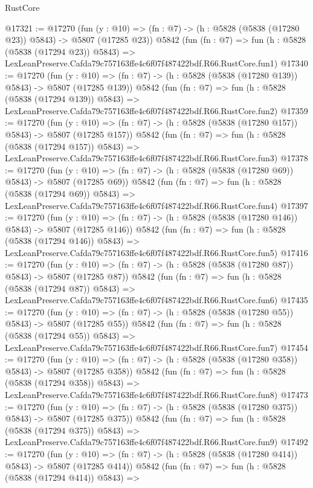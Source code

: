 \begin{lexlean}{RustCore}
\begin{coremodule}
@17321 := @17270
    (fun (y : @10) => (fn : @7) -> (h : @5828 (@5838 (@17280 @23)) @5843) -> @5807 (@17285 @23))
    @5842
    (fun (fn : @7) =>
    fun (h : @5828 (@5838 (@17294 @23)) @5843) =>
    LexLeanPreserve.Cafda79c757163ffe4c6f07f487422bdf.R66.RustCore.fun1)
@17340 := @17270
    (fun (y : @10) => (fn : @7) -> (h : @5828 (@5838 (@17280 @139)) @5843) -> @5807 (@17285 @139))
    @5842
    (fun (fn : @7) =>
    fun (h : @5828 (@5838 (@17294 @139)) @5843) =>
    LexLeanPreserve.Cafda79c757163ffe4c6f07f487422bdf.R66.RustCore.fun2)
@17359 := @17270
    (fun (y : @10) => (fn : @7) -> (h : @5828 (@5838 (@17280 @157)) @5843) -> @5807 (@17285 @157))
    @5842
    (fun (fn : @7) =>
    fun (h : @5828 (@5838 (@17294 @157)) @5843) =>
    LexLeanPreserve.Cafda79c757163ffe4c6f07f487422bdf.R66.RustCore.fun3)
@17378 := @17270
    (fun (y : @10) => (fn : @7) -> (h : @5828 (@5838 (@17280 @69)) @5843) -> @5807 (@17285 @69))
    @5842
    (fun (fn : @7) =>
    fun (h : @5828 (@5838 (@17294 @69)) @5843) =>
    LexLeanPreserve.Cafda79c757163ffe4c6f07f487422bdf.R66.RustCore.fun4)
@17397 := @17270
    (fun (y : @10) => (fn : @7) -> (h : @5828 (@5838 (@17280 @146)) @5843) -> @5807 (@17285 @146))
    @5842
    (fun (fn : @7) =>
    fun (h : @5828 (@5838 (@17294 @146)) @5843) =>
    LexLeanPreserve.Cafda79c757163ffe4c6f07f487422bdf.R66.RustCore.fun5)
@17416 := @17270
    (fun (y : @10) => (fn : @7) -> (h : @5828 (@5838 (@17280 @87)) @5843) -> @5807 (@17285 @87))
    @5842
    (fun (fn : @7) =>
    fun (h : @5828 (@5838 (@17294 @87)) @5843) =>
    LexLeanPreserve.Cafda79c757163ffe4c6f07f487422bdf.R66.RustCore.fun6)
@17435 := @17270
    (fun (y : @10) => (fn : @7) -> (h : @5828 (@5838 (@17280 @55)) @5843) -> @5807 (@17285 @55))
    @5842
    (fun (fn : @7) =>
    fun (h : @5828 (@5838 (@17294 @55)) @5843) =>
    LexLeanPreserve.Cafda79c757163ffe4c6f07f487422bdf.R66.RustCore.fun7)
@17454 := @17270
    (fun (y : @10) => (fn : @7) -> (h : @5828 (@5838 (@17280 @358)) @5843) -> @5807 (@17285 @358))
    @5842
    (fun (fn : @7) =>
    fun (h : @5828 (@5838 (@17294 @358)) @5843) =>
    LexLeanPreserve.Cafda79c757163ffe4c6f07f487422bdf.R66.RustCore.fun8)
@17473 := @17270
    (fun (y : @10) => (fn : @7) -> (h : @5828 (@5838 (@17280 @375)) @5843) -> @5807 (@17285 @375))
    @5842
    (fun (fn : @7) =>
    fun (h : @5828 (@5838 (@17294 @375)) @5843) =>
    LexLeanPreserve.Cafda79c757163ffe4c6f07f487422bdf.R66.RustCore.fun9)
@17492 := @17270
    (fun (y : @10) => (fn : @7) -> (h : @5828 (@5838 (@17280 @414)) @5843) -> @5807 (@17285 @414))
    @5842
    (fun (fn : @7) =>
    fun (h : @5828 (@5838 (@17294 @414)) @5843) =>

\end{coremodule}
\end{lexlean}
